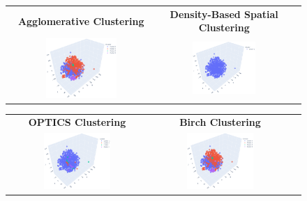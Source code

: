\begin{figure}
\begin{tabular}{ccc}
		\textbf{Agglomerative Clustering} &
		\textbf{Density-Based Spatial Clustering} \\
		\includegraphics[width=0.5\textwidth]{NOTEBOOK/IMAGENES_CLUSTERING/TNSE_Agglomerative_Clustering} &
		\includegraphics[width=0.5\textwidth]{NOTEBOOK/IMAGENES_CLUSTERING/TNSE_Density_Based_Spatial_Clustering} 
	\end{tabular}
\end{figure}

\begin{figure}
	\setlength\tabcolsep{3pt}%
	\centering
	\begin{tabular}{ccc}
		\textbf{OPTICS Clustering} &
		\textbf{Birch Clustering} \\
		\includegraphics[width=0.5\textwidth]{NOTEBOOK/IMAGENES_CLUSTERING/TNSE_OPTICS Clustering} &
		\includegraphics[width=0.5\textwidth]{NOTEBOOK/IMAGENES_CLUSTERING/TNSE_Agglomerative_Clustering} 
	\end{tabular}
\end{figure}

